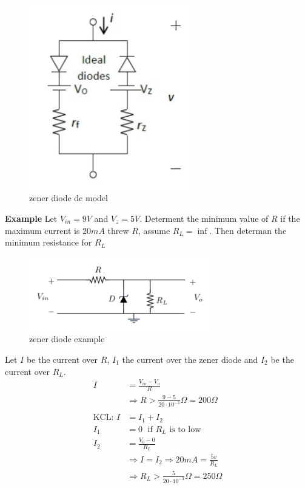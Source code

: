 \begin{figure}[h]
    \centering
    \includegraphics[width=7cm]{image/zener_diode_dc.png}
    \caption{zener diode dc model}
\end{figure}

\newpage
\textbf{Example}
Let $V_{in}=9V$ and $V_z=5V$. Determent the minimum value of $R$ if 
the maximum current is $20mA$ threw $R$, assume $R_L=\inf$. 
Then determan the minimum resistance for $R_L$
\begin{figure}[h]
    \vspace{10mm}
    \centering
    \includegraphics[width=8cm]{image/example_zener-diode.pdf}
    \caption{zener diode example}
\end{figure}

Let $I$ be the current over $R$, $I_1$ the current over the zener diode
and $I_2$ be the current over $R_L$.
\begin{align*}
    I &= \frac{V_{in}-V_o}{R} \\
    &\Rightarrow R > \frac{9-5}{20\cdot10^{-3}}\Omega = 200\Omega \\ 
    \\
    \text{KCL: }  I &= I_1 + I_2 \\
    I_1 &= 0 \; \text{ if $R_L$ is to low} \\
    I_2 &= \frac{V_0-0}{R_L} \\
    &\Rightarrow I = I_2 \Rightarrow 20mA = \frac{5v}{R_L} \\
    &\Rightarrow R_L > \frac{5}{20\cdot10^{-3}}\Omega = 250\Omega \\
\end{align*}


